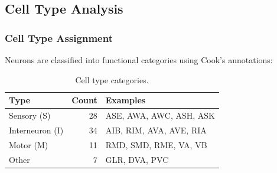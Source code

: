 \documentclass{article}
\theoremstyle{plain}
\theoremstyle{definition}
\theoremstyle{remark}
\newcommand{\1}{\mathbf{1}}
\begin{document}

\subsection{Cell Type Analysis}
\label{app:celltype}

\subsubsection{Cell Type Assignment}

Neurons are classified into functional categories using Cook's annotations:

\begin{table}[h!]
\centering
\caption{Cell type categories.}
\label{tab:celltypes}
\begin{tabular}{lrl}
\toprule
\textbf{Type} & \textbf{Count} & \textbf{Examples} \\
\midrule
Sensory (S) & 28 & ASE, AWA, AWC, ASH, ASK \\
Interneuron (I) & 34 & AIB, RIM, AVA, AVE, RIA \\
Motor (M) & 11 & RMD, SMD, RME, VA, VB \\
Other & 7 & GLR, DVA, PVC \\
\bottomrule
\end{tabular}
\end{table}
\end{document}
